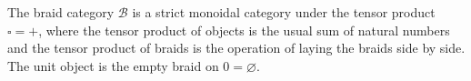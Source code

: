 The braid category $\mathcal{B}$ is a strict monoidal category under the tensor product $\square = +$, where the tensor product of objects is the usual sum of natural numbers and the tensor product of braids is the operation of laying the braids side by side. The unit object is the empty braid on $0 = \varnothing$.
